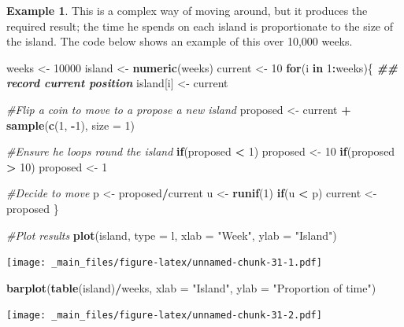 \documentclass[
]{book}
\newenvironment{Shaded}{\begin{snugshade}}{\end{snugshade}}
\newcommand{\AttributeTok}[1]{\textcolor[rgb]{0.13,0.29,0.53}{#1}}
\newcommand{\CommentTok}[1]{\textcolor[rgb]{0.56,0.35,0.01}{\textit{#1}}}
\newcommand{\ControlFlowTok}[1]{\textcolor[rgb]{0.13,0.29,0.53}{\textbf{#1}}}
\newcommand{\DecValTok}[1]{\textcolor[rgb]{0.00,0.00,0.81}{#1}}
\newcommand{\DocumentationTok}[1]{\textcolor[rgb]{0.56,0.35,0.01}{\textbf{\textit{#1}}}}
\newcommand{\FunctionTok}[1]{\textcolor[rgb]{0.13,0.29,0.53}{\textbf{#1}}}
\newcommand{\NormalTok}[1]{#1}
\newcommand{\OtherTok}[1]{\textcolor[rgb]{0.56,0.35,0.01}{#1}}
\newcommand{\SpecialCharTok}[1]{\textcolor[rgb]{0.81,0.36,0.00}{\textbf{#1}}}
\newcommand{\StringTok}[1]{\textcolor[rgb]{0.31,0.60,0.02}{#1}}
\theoremstyle{definition}
\theoremstyle{definition}
\newtheorem{example}{Example}[chapter]
\theoremstyle{definition}
\theoremstyle{definition}
\theoremstyle{remark}
\begin{document}
\begin{example}
This is a complex way of moving around, but it produces the required result; the time he spends on each island is proportionate to the size of the island. The code below shows an example of this over 10,000 weeks.

\begin{Shaded}
\begin{Highlighting}[]
\NormalTok{weeks }\OtherTok{\textless{}{-}} \DecValTok{10000}
\NormalTok{island }\OtherTok{\textless{}{-}} \FunctionTok{numeric}\NormalTok{(weeks)}
\NormalTok{current }\OtherTok{\textless{}{-}} \DecValTok{10}
\ControlFlowTok{for}\NormalTok{(i }\ControlFlowTok{in} \DecValTok{1}\SpecialCharTok{:}\NormalTok{weeks)\{}
  \DocumentationTok{\#\# record current position}
\NormalTok{  island[i] }\OtherTok{\textless{}{-}}\NormalTok{ current}
  
  \CommentTok{\#Flip a coin to move to a propose a new island}
\NormalTok{  proposed }\OtherTok{\textless{}{-}}\NormalTok{ current }\SpecialCharTok{+} \FunctionTok{sample}\NormalTok{(}\FunctionTok{c}\NormalTok{(}\DecValTok{1}\NormalTok{, }\SpecialCharTok{{-}}\DecValTok{1}\NormalTok{), }\AttributeTok{size =} \DecValTok{1}\NormalTok{)}
  
  \CommentTok{\#Ensure he loops round the island}
  \ControlFlowTok{if}\NormalTok{(proposed }\SpecialCharTok{\textless{}} \DecValTok{1}\NormalTok{) }
\NormalTok{    proposed }\OtherTok{\textless{}{-}} \DecValTok{10}
  \ControlFlowTok{if}\NormalTok{(proposed }\SpecialCharTok{\textgreater{}} \DecValTok{10}\NormalTok{)}
\NormalTok{    proposed }\OtherTok{\textless{}{-}} \DecValTok{1}
  
  \CommentTok{\#Decide to move}
\NormalTok{  p }\OtherTok{\textless{}{-}}\NormalTok{ proposed}\SpecialCharTok{/}\NormalTok{current}
\NormalTok{  u }\OtherTok{\textless{}{-}} \FunctionTok{runif}\NormalTok{(}\DecValTok{1}\NormalTok{)}
  \ControlFlowTok{if}\NormalTok{(u }\SpecialCharTok{\textless{}}\NormalTok{ p)}
\NormalTok{    current }\OtherTok{\textless{}{-}}\NormalTok{ proposed}
\NormalTok{\}}

\CommentTok{\#Plot results}
\FunctionTok{plot}\NormalTok{(island, }\AttributeTok{type =} \StringTok{\textquotesingle{}l\textquotesingle{}}\NormalTok{, }\AttributeTok{xlab =} \StringTok{"Week"}\NormalTok{, }\AttributeTok{ylab =} \StringTok{"Island"}\NormalTok{)}
\end{Highlighting}
\end{Shaded}

\texttt{[image: \_main\_files/figure-latex/unnamed-chunk-31-1.pdf]}

\begin{Shaded}
\begin{Highlighting}[]
\FunctionTok{barplot}\NormalTok{(}\FunctionTok{table}\NormalTok{(island)}\SpecialCharTok{/}\NormalTok{weeks, }\AttributeTok{xlab =} \StringTok{"Island"}\NormalTok{, }
        \AttributeTok{ylab =} \StringTok{"Proportion of time"}\NormalTok{)}
\end{Highlighting}
\end{Shaded}

\texttt{[image: \_main\_files/figure-latex/unnamed-chunk-31-2.pdf]}
\end{example}
\end{document}
